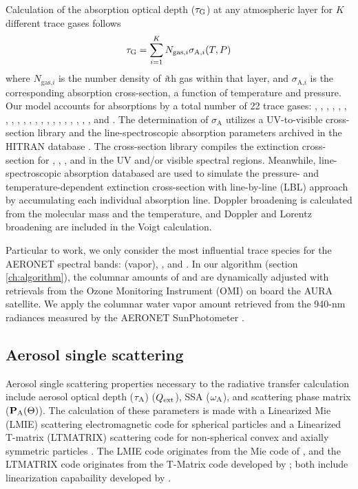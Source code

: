 Calculation of the absorption optical depth ($\tau_\text{G}$) at
any atmospheric layer for $K$ different trace gases follows
\begin{equation}
\tau_\text{G} = \sum_{i=1}^K N_{\text{gas,}i}\sigma_{\text{A,}i}(T,P) 
\end{equation}
where $N_{\text{gas,}i}$ is the number density of \textit{i}th gas
within that layer, and $\sigma_{\text{A,}i}$ is the corresponding
absorption cross-section, a function of temperature and pressure. 
Our model accounts for absorptions by a total number of
22 trace gases: , , , , ,
, , , , , , ,
, , , , , , ,
, , and .
The determination of $\sigma_\text{A}$  
utilizes a UV-to-visible cross-section library and the line-spectroscopic
absorption parameters archived in the HITRAN database \citep{Orphal03,
Rothman09}. The cross-section library compiles the extinction
cross-section for , , , and  in the UV
and/or visible spectral regions. Meanwhile, line-spectroscopic 
absorption databased are used to simulate the pressure- and
temperature-dependent extinction cross-section with line-by-line (LBL) 
approach \citep{Liou02,Rothman09} by accumulating each individual 
absorption line. Doppler broadening is calculated from the molecular mass
and the temperature, and Doppler and Lorentz broadening are included in the
Voigt calculation.

Particular to work, we only consider the most influential 
trace species for the AERONET spectral bands:  (vapor), , 
and . In our algorithm (section \ref{ch:algorithm}), the columnar
amounts of  and  are dynamically adjusted with retrievals from the
Ozone Monitoring Instrument (OMI) \citep{Levelt06} on board the
AURA satellite. We apply the columnar water vapor amount retrieved from
the 940-nm radiances measured by the AERONET SunPhotometer
\cite{Halthore97}.

\subsection{Aerosol single scattering} \label{subsec:mie}

Aerosol single scattering properties necessary to the radiative
transfer calculation include aerosol optical depth ($\tau_\text{A}$)
($Q_\text{ext}$), SSA ($\omega_\text{A}$), and scattering phase matrix ($\mathbf{P}_\text{A}(\Theta)$).
The calculation of these parameters is made with a Linearized Mie (LMIE)
scattering electromagnetic code for spherical particles and a Linearized
T-matrix (LTMATRIX) scattering code for non-spherical convex and axially
symmetric particles \citep{Spurr12}. The LMIE code originates from the Mie code
of \citet{deRooij84}, and the LTMATRIX code originates from the T-Matrix
code developed by \citet{Mishchenko96, Mishchenko98}; both include
linearization capabaility developed by \citet{Spurr12}.

